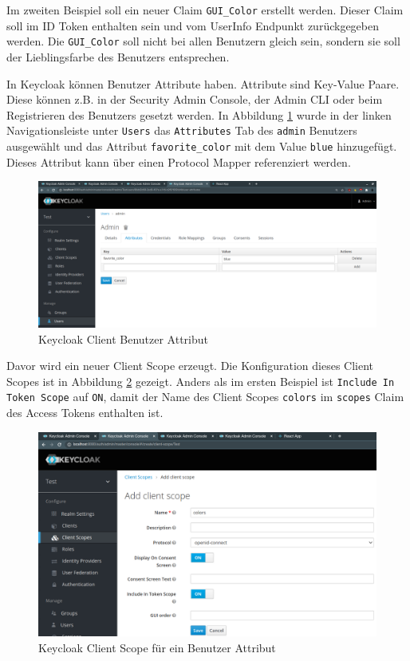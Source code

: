 Im zweiten Beispiel soll ein neuer Claim \texttt{GUI\_Color} erstellt werden. Dieser Claim soll im ID Token enthalten sein und vom UserInfo Endpunkt zurückgegeben werden. Die \texttt{GUI\_Color} soll nicht bei allen Benutzern gleich sein, sondern sie soll der Lieblingsfarbe des Benutzers entsprechen.

In Keycloak können Benutzer Attribute haben. Attribute sind Key-Value Paare. Diese können z.B. in der Security Admin Console, der Admin CLI oder beim Registrieren des Benutzers gesetzt werden. In Abbildung \ref{fig:EB_Keycloak Client User Attribut} wurde in der linken Navigationsleiste unter \texttt{Users} das \texttt{Attributes} Tab des \texttt{admin} Benutzers ausgewählt und das Attribut \texttt{favorite\_color} mit dem Value \texttt{blue} hinzugefügt. Dieses Attribut kann über einen Protocol Mapper referenziert werden.

\begin{figure}[!ht]
	\centering
	\includegraphics[width=1\textwidth]{Images/Ebert/KeycloakNewUserAttribute.PNG}
	\caption{Keycloak Client Benutzer Attribut}
	\label{fig:EB_Keycloak Client User Attribut}
\end{figure}

Davor wird ein neuer Client Scope erzeugt. Die Konfiguration dieses Client Scopes ist in Abbildung \ref{fig:EB_Keycloak Client Scope für User Attribut} gezeigt. Anders als im ersten Beispiel ist \texttt{Include In Token Scope} auf \texttt{ON}, damit der Name des Client Scopes \texttt{colors} im \texttt{scopes} Claim des Access Tokens enthalten ist.

\begin{figure}[!ht]
	\centering
	\includegraphics[width=1\textwidth]{Images/Ebert/KeycloakNewUserAttributeClientScope.PNG}
	\caption{Keycloak Client Scope für ein Benutzer Attribut}
	\label{fig:EB_Keycloak Client Scope für User Attribut}
\end{figure}

